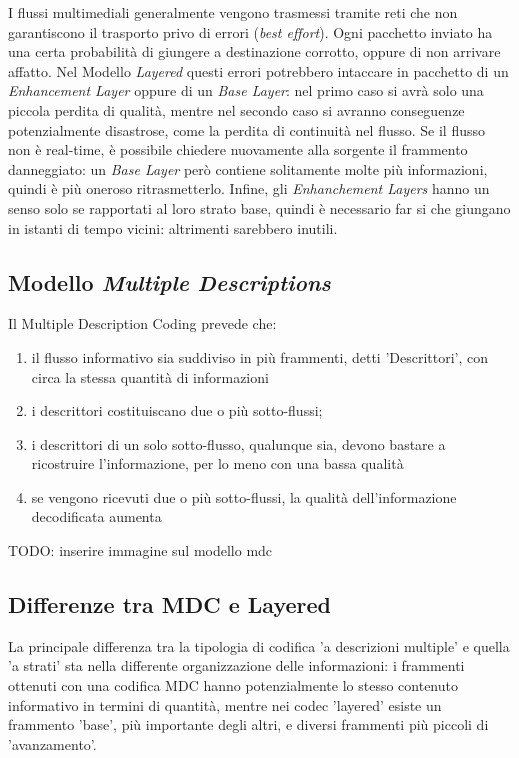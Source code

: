 I flussi multimediali generalmente vengono trasmessi tramite reti che non
garantiscono il trasporto privo di errori (\emph{best effort}). Ogni pacchetto
inviato ha una certa probabilità di giungere a destinazione corrotto, oppure di
non arrivare affatto. Nel Modello \emph{Layered} questi errori potrebbero
intaccare in pacchetto di un \emph{Enhancement Layer} oppure di un \emph{Base
Layer}: nel primo caso si avrà solo una piccola perdita di qualità, mentre nel
secondo caso si avranno conseguenze potenzialmente disastrose, come la perdita
di continuità nel flusso. Se il flusso non è real-time, è possibile chiedere
nuovamente alla sorgente il frammento danneggiato: un \emph{Base Layer} però
contiene solitamente molte più informazioni, quindi è più oneroso
ritrasmetterlo.
Infine, gli \emph{Enhanchement Layers} hanno un senso solo se rapportati al
loro strato base, quindi è necessario far si che giungano in istanti di
tempo vicini: altrimenti sarebbero inutili.



\subsection{Modello \emph{Multiple Descriptions}}

Il Multiple Description Coding prevede che:
\begin{enumerate}
\item il flusso informativo sia suddiviso in più frammenti, detti 'Descrittori', con circa la stessa quantità di informazioni
\item i descrittori costituiscano due o più sotto-flussi;
\item i descrittori di un solo sotto-flusso, qualunque sia, devono bastare a ricostruire l'informazione, per lo meno con una bassa qualità
\item se vengono ricevuti due o più sotto-flussi, la qualità dell'informazione decodificata aumenta 
\end{enumerate}

TODO: inserire immagine sul modello mdc

\subsection{Differenze tra MDC e Layered}

La principale differenza tra la tipologia di codifica 'a descrizioni multiple' e
quella 'a strati' sta nella differente organizzazione delle informazioni: i
frammenti ottenuti con una codifica MDC hanno potenzialmente lo stesso contenuto
informativo in termini di quantità, mentre nei codec 'layered' esiste un
frammento 'base', più importante degli altri, e diversi frammenti più piccoli di
'avanzamento'.



